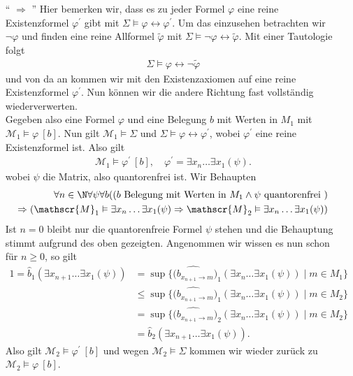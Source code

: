 \begin{solution}
\begin{enumerate}
		\item[`` $\Rightarrow$ ''] Hier bemerken wir, dass es zu jeder Formel $\varphi$ eine reine Existenzformel $\varphi^\prime$ gibt mit $\Sigma \vDash \varphi \leftrightarrow \varphi^\prime$. Um das einzusehen betrachten wir $\neg \varphi$ und finden eine reine Allformel $\tilde{\varphi}$ mit $\Sigma \vDash \neg \varphi \leftrightarrow \tilde{\varphi}$. Mit einer Tautologie folgt
		\begin{align*}
		\Sigma \vDash \varphi \leftrightarrow \neg \tilde{\varphi}
		\end{align*}
		und von da an kommen wir mit den Existenzaxiomen auf eine reine Existenzformel $\varphi^\prime$. Nun können wir die andere Richtung fast vollständig wiederverwerten.\\ 
		Gegeben also eine Formel $\varphi$ und eine Belegung $b$ mit Werten in $M_1$ mit $\mathscr{M}_1 \vDash \varphi \ [b]$. Nun gilt $\mathscr{M}_1 \vDash \Sigma$ und $\Sigma \vDash \varphi \leftrightarrow \varphi^\prime$, wobei $\varphi^\prime$ eine reine Existenzformel ist. Also gilt 
		\begin{align*}
		\mathscr{M}_1 \vDash \varphi^\prime \ [b], \quad \varphi^\prime = \exists x_n \dots \exists x_1(\psi).
		\end{align*}
		wobei $\psi$ die Matrix, also quantorenfrei ist. Wir Behaupten
		\begin{align*}
		\forall n \in \N \forall \psi \forall b ((b \text{ Belegung mit Werten in } M_1 \land \psi \text{ quantorenfrei }) \\
		\Rightarrow (\mathscr{M}_1 \vDash \exists x_n \dots \exists x_1 (\psi) \Rightarrow \mathscr{M}_2 \vDash \exists x_n \dots \exists x_1 (\psi))
		\end{align*} 
		Ist $n = 0$ bleibt nur die quantorenfreie Formel $\psi$ stehen und die Behauptung stimmt aufgrund des oben gezeigten. Angenommen wir wissen es nun schon für $n \geq 0$, so gilt
		\begin{align*}
		1 = \widehat{b}_1(\exists x_{n + 1} \dots \exists x_1 (\psi)) &= \sup\{\widehat{(b_{x_{n + 1} \to m}})_1(\exists x_n \dots \exists x_1(\psi)) \mid m \in M_1\} \\
		&\leq \sup\{\widehat{(b_{x_{n + 1} \to m}})_1(\exists x_n \dots \exists x_1(\psi)) \mid m \in M_2\} \\
		&= \sup\{\widehat{(b_{x_{n + 1} \to m}})_2(\exists x_n \dots \exists x_1(\psi)) \mid m \in M_2\} \\
		&= \widehat{b}_2(\exists x_{n + 1} \dots \exists x_1 (\psi)).
		\end{align*}
		Also gilt $\mathscr{M}_2 \vDash \varphi^\prime \ [b]$ und wegen $\mathscr{M}_2 \vDash \Sigma$ kommen wir wieder zurück zu $\mathscr{M}_2 \vDash \varphi \ [b]$.
	\end{enumerate}
\end{solution}

